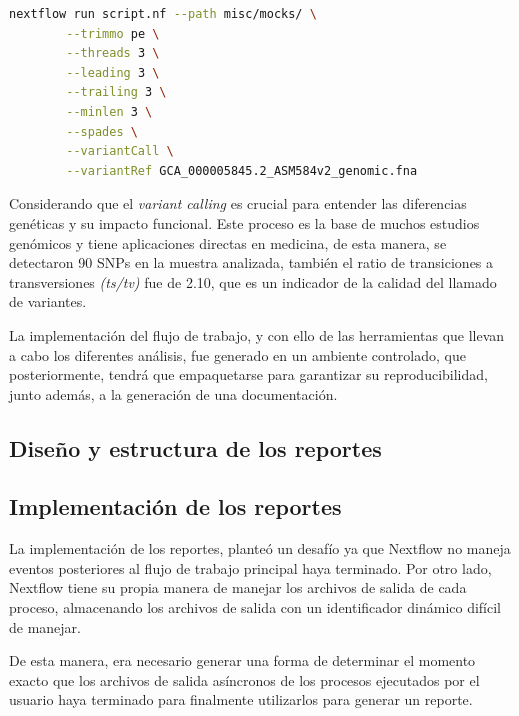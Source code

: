 \documentclass[12pt]{article}
\begin{document}
\begin{center}
    \begin{lstlisting}[language=bash, caption=Comando para realizar un llama de variantes en \textit{Escherichia coli} \emph{(elaboración propia)}., label=lst:VARIANTCaso1]
        nextflow run script.nf --path misc/mocks/ \
        --trimmo pe \
        --threads 3 \
        --leading 3 \
        --trailing 3 \
        --minlen 3 \
        --spades \
        --variantCall \
        --variantRef GCA_000005845.2_ASM584v2_genomic.fna 
    \end{lstlisting}
\end{center}

Considerando que el \emph{variant calling} es 
crucial para entender las diferencias genéticas y 
su impacto funcional. Este proceso es la base de
muchos estudios genómicos y tiene aplicaciones 
directas en medicina, de esta manera, se detectaron 
90 SNPs en la muestra analizada, también el ratio 
de transiciones a transversiones \emph{(ts/tv)} 
fue de 2.10, 
que es un indicador de la calidad del llamado de 
variantes. 

La implementación del flujo de trabajo, y con 
ello de las herramientas que llevan a cabo los 
diferentes análisis, fue generado en un ambiente 
controlado, que posteriormente, tendrá que empaquetarse 
para garantizar su reproducibilidad, junto además, 
a la generación de una documentación.

\subsection{Diseño y estructura de los reportes}

\subsection{Implementación de los reportes}

La implementación de los reportes, planteó un desafío ya que Nextflow 
no maneja eventos posteriores al  flujo de trabajo principal haya terminado. 
Por otro lado, Nextflow tiene su propia manera de manejar los archivos de 
salida de cada proceso, almacenando los archivos de salida con un 
identificador dinámico difícil de manejar.

De esta manera, era necesario generar una forma de determinar el 
momento exacto que los archivos de salida asíncronos de los procesos 
ejecutados por el usuario haya terminado para finalmente utilizarlos para 
generar un reporte.
\end{document}
